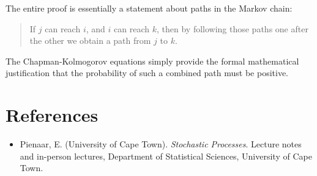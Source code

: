 \documentclass[12pt]{article}
\begin{document}
The entire proof is essentially a statement about paths in the Markov chain:\\

\begin{quote}
If $j$ can reach $i$, and $i$ can reach $k$, then by following those paths one after the other we obtain a path from $j$ to $k$.
\end{quote}

The Chapman-Kolmogorov equations simply provide the formal mathematical justification that the probability of such a combined path must be positive.

\section*{References}

\begin{itemize}

\item Pienaar, E. (University of Cape Town). 
\textit{Stochastic Processes}. 
Lecture notes and in-person lectures, Department of Statistical Sciences,
University of Cape Town.

\end{itemize}
\end{document}
